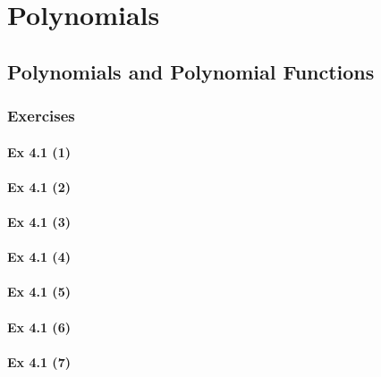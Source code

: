 \setcounter{chapter}{0}
\renewcommand{\thechapter}{4}
\chapter{Polynomials}\label{ch:4}
\setcounter{equation}{0}	        %

\section{Polynomials and Polynomial Functions}\label{sec:4.1}
\subsection{Exercises}\label{sec:4.1_Exercises}

\subsubsection{Ex 4.1 (1)}\label{sec:Ex_4.1.1}

\subsubsection{Ex 4.1 (2)}\label{sec:Ex_4.1.2}

\subsubsection{Ex 4.1 (3)}\label{sec:Ex_4.1.3}

\subsubsection{Ex 4.1 (4)}\label{sec:Ex_4.1.4}

\subsubsection{Ex 4.1 (5)}\label{sec:Ex_4.1.5}

\subsubsection{Ex 4.1 (6)}\label{sec:Ex_4.1.6}

\subsubsection{Ex 4.1 (7)}\label{sec:Ex_4.1.7}

